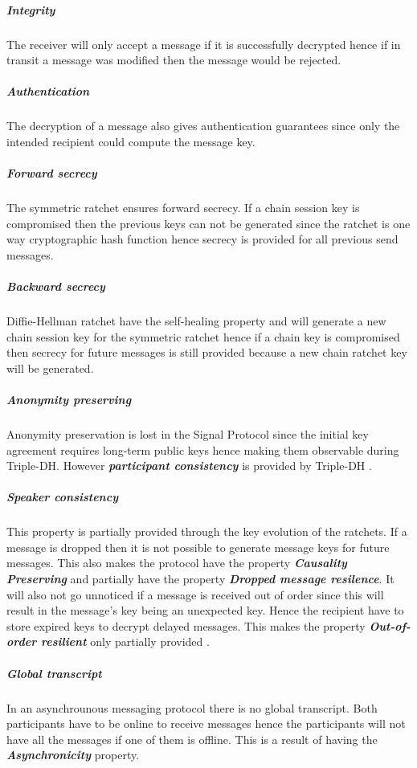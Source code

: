 \subparagraph{Integrity} The receiver will only accept a message if it is successfully decrypted hence if in transit a message was modified then the message would be rejected.

\subparagraph{Authentication} The decryption of a message also gives authentication guarantees since only the intended recipient could compute the message key.

\subparagraph{Forward secrecy} The symmetric ratchet ensures forward secrecy. If a chain session key is compromised then the previous keys can not be generated since the ratchet is one way cryptographic hash function hence secrecy is provided for all previous send messages.  

\subparagraph{Backward secrecy} Diffie-Hellman ratchet have the self-healing property and will generate a new chain session key for the symmetric ratchet hence if a chain key is compromised then secrecy for future messages is still provided because a new chain ratchet key will be generated.

\subparagraph{Anonymity preserving}

Anonymity preservation is lost in the Signal Protocol since the initial key agreement requires long-term public keys hence making them observable during Triple-DH. However \textbf{\emph{participant consistency}} is provided by Triple-DH \cite{sok}. %

\subparagraph{Speaker consistency}
This property is partially provided through the key evolution of the ratchets. If a message is dropped then it is not possible to generate message keys for future messages. This also makes the protocol have the property \textbf{\emph{Causality Preserving}} and partially have the property \emph{\textbf{Dropped message resilence}}. It will also not go unnoticed if a message is received out of order since this will result in the message's key being an unexpected key. Hence the recipient have to store expired keys to decrypt delayed messages. This makes the property \emph{\textbf{Out-of-order resilient}} only partially provided \cite{sok}.

\subparagraph{Global transcript} 
In an asynchrounous messaging protocol there is no global transcript. Both participants have to be online to receive messages hence the participants will not have all the messages if one of them is offline. This is a result of having the \textbf{\emph{Asynchronicity}} property.

